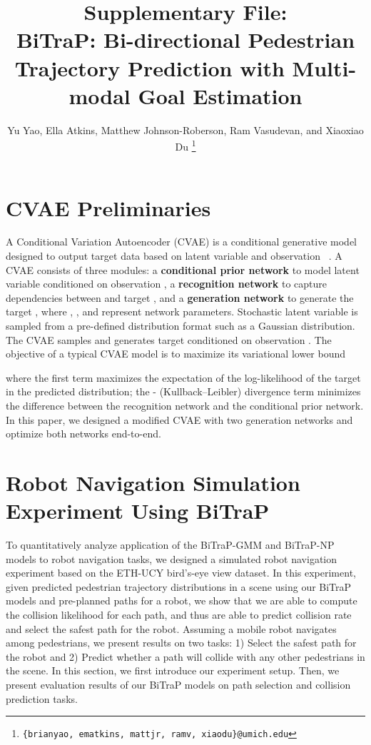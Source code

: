 \documentclass[letterpaper, 10 pt, conference]{ieeeconf}
\title{\Large \bf
Supplementary File: \\
\large BiTraP: Bi-directional Pedestrian Trajectory Prediction with Multi-modal Goal Estimation}
\author{Yu Yao, Ella Atkins, Matthew Johnson-Roberson, Ram Vasudevan, and Xiaoxiao Du
\thanks{\tt\scriptsize *\{brianyao, ematkins, mattjr, ramv, xiaodu\}@umich.edu}
}
\begin{document}
\maketitle
\section{CVAE Preliminaries}
A Conditional Variation Autoencoder (CVAE) is a conditional generative model designed to output target data  based on latent variable  and observation ~\cite{sohn2015learning}. A CVAE consists of three modules: a \textbf{conditional prior network}  to model latent variable  conditioned on observation , a \textbf{recognition network}  to capture dependencies between  and target , and a \textbf{generation network}  to generate the target , where , , and  represent network parameters. Stochastic latent variable  is sampled from a pre-defined distribution format such as a Gaussian distribution. The CVAE samples  and generates target  conditioned on observation . The objective of a typical CVAE model is to maximize its variational lower bound

where the first term maximizes the expectation of the log-likelihood 
of the target in the predicted distribution; 
the - (Kullback–Leibler) divergence term minimizes the difference 
between the recognition network and the conditional prior network. In this paper, we designed a modified CVAE with two generation networks and optimize both networks end-to-end.

\section{Robot Navigation Simulation Experiment Using BiTraP}

To quantitatively analyze application of the BiTraP-GMM and BiTraP-NP models to robot navigation tasks, we designed a simulated robot navigation
experiment based on the ETH-UCY bird's-eye view dataset. In this experiment, given  predicted pedestrian trajectory distributions in a scene using our BiTraP models and pre-planned paths for a robot, we show that we are able to compute the collision likelihood for each path, and thus are able to predict collision rate and select the safest path for the robot. Assuming a mobile robot navigates among pedestrians, we present results on two tasks: 1) Select the safest path for the robot and 2) Predict whether a path will collide with any other pedestrians in the scene. In this section, we first introduce our experiment setup. Then, we present evaluation results of our BiTraP models on path selection and collision prediction tasks.
\end{document}
